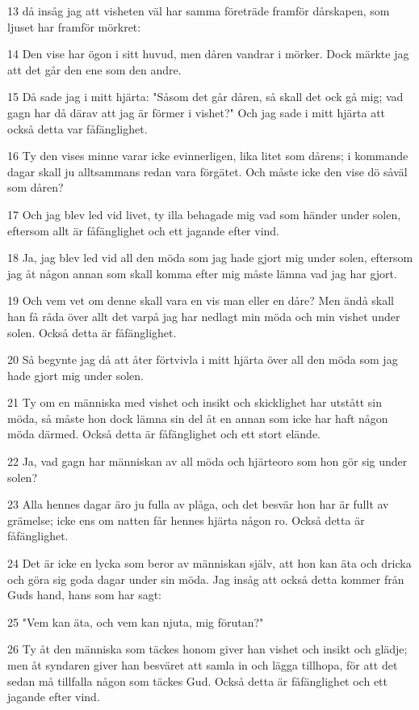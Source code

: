 \par 13 då insåg jag att visheten väl har samma företräde framför dårskapen, som ljuset har framför mörkret:
\par 14 Den vise har ögon i sitt huvud, men dåren vandrar i mörker. Dock märkte jag att det går den ene som den andre.
\par 15 Då sade jag i mitt hjärta: "Såsom det går dåren, så skall det ock gå mig; vad gagn har då därav att jag är förmer i vishet?" Och jag sade i mitt hjärta att också detta var fåfänglighet.
\par 16 Ty den vises minne varar icke evinnerligen, lika litet som dårens; i kommande dagar skall ju alltsammans redan vara förgätet. Och måste icke den vise dö såväl som dåren?
\par 17 Och jag blev led vid livet, ty illa behagade mig vad som händer under solen, eftersom allt är fåfänglighet och ett jagande efter vind.
\par 18 Ja, jag blev led vid all den möda som jag hade gjort mig under solen, eftersom jag åt någon annan som skall komma efter mig måste lämna vad jag har gjort.
\par 19 Och vem vet om denne skall vara en vis man eller en dåre? Men ändå skall han få råda över allt det varpå jag har nedlagt min möda och min vishet under solen. Också detta är fåfänglighet.
\par 20 Så begynte jag då att åter förtvivla i mitt hjärta över all den möda som jag hade gjort mig under solen.
\par 21 Ty om en människa med vishet och insikt och skicklighet har utstått sin möda, så måste hon dock lämna sin del åt en annan som icke har haft någon möda därmed. Också detta är fåfänglighet och ett stort elände.
\par 22 Ja, vad gagn har människan av all möda och hjärteoro som hon gör sig under solen?
\par 23 Alla hennes dagar äro ju fulla av plåga, och det besvär hon har är fullt av grämelse; icke ens om natten får hennes hjärta någon ro. Också detta är fåfänglighet.
\par 24 Det är icke en lycka som beror av människan själv, att hon kan äta och dricka och göra sig goda dagar under sin möda. Jag insåg att också detta kommer från Guds hand, hans som har sagt:
\par 25 "Vem kan äta, och vem kan njuta, mig förutan?"
\par 26 Ty åt den människa som täckes honom giver han vishet och insikt och glädje; men åt syndaren giver han besväret att samla in och lägga tillhopa, för att det sedan må tillfalla någon som täckes Gud. Också detta är fåfänglighet och ett jagande efter vind.

